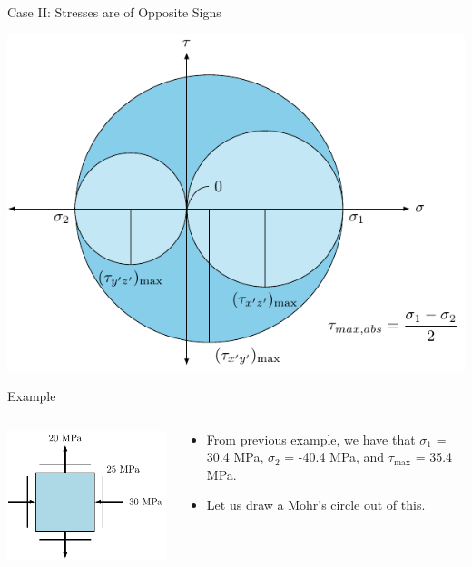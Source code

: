 \documentclass[10pt, svgnames]{beamer}
\begin{document}
\begin{frame}[label={sec:org42b1a17}]{Case II: Stresses are of Opposite Signs}
\begin{center}
\includegraphics[width=.9\linewidth]{pictures/abs-max-shear-case-II.pdf}
\end{center}
\end{frame}

\begin{frame}[label={sec:org95fed53}]{Example}
\begin{columns}
\begin{column}{0.5\columnwidth}
\begin{center}
\includegraphics[width=.9\linewidth]{pictures/max-abs-shear-stress-problem.pdf}
\end{center}
\end{column}

\begin{column}{0.5\columnwidth}
\begin{itemize}
\item From previous example, we have that \(\sigma_1\) = 30.4 MPa,
\(\sigma_2\) = -40.4 MPa, and \(\tau_{\max}\) = 35.4 MPa.

\item Let us draw a Mohr's circle out of this.
\end{itemize}
\end{column}
\end{columns}
\end{frame}
\end{document}
